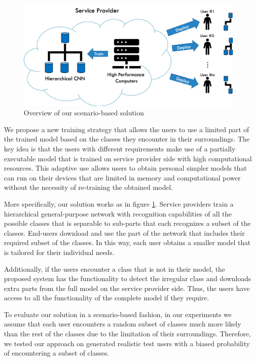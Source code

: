 \begin{figure}
    \centering
    \includegraphics[width=.7\textwidth]{images/ArchitectureOverview(ver2).png}
    \caption{Overview of our scenario-based solution}
    \label{fig:overview}
\end{figure}

We propose a new training strategy that 
allows the users to use a limited part of the trained model based on the classes they encounter in their surroundings. 
The key idea is that the users with different requirements make use of a partially executable model that is trained on service provider side with high computational resources.
This adaptive use allows users to obtain personal simpler models that can run on their devices 
that are limited in memory and computational power without the necessity of re-training the obtained model. 

More specifically, our solution works as in figure \ref{fig:overview}. 
Service providers train a hierarchical
general-purpose network with recognition capabilities of all the possible classes 
that is separable to sub-parts that each recognizes a subset of the classes. 
End-users download and use the part of the network that includes their required subset of the classes.
In this way, each user obtains a smaller model that is tailored for their individual needs.

Additionally, if the users encounter a class that is not in their model, 
the proposed system has the functionality to detect the irregular class and 
downloads extra parts from the full model on the service provider side. 
Thus, the users have access to all the functionality of the complete model if they require.

To evaluate our solution in a scenario-based fashion, 
in our experiments we assume that 
each user encounters a random subset of classes much more likely than 
the rest of the classes due to the limitation of their surroundings. 
Therefore, we tested our approach on generated realistic test users with a biased probability of encountering a subset of classes.

